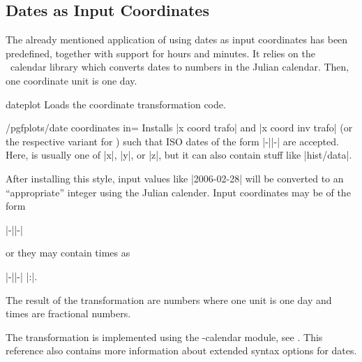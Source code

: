 \subsection{Dates as Input Coordinates}
{
\def\pgfplotsmanualcurlibrary{dateplot}
\label{pgfplots:sec:date:coords}
The already mentioned application of using dates as input coordinates has been predefined, together with support for hours and minutes. It relies on the \pgfname\ calendar library which converts dates to numbers in the Julian calendar. Then, one coordinate unit is one day.

\begin{pgfplotslibrary}{dateplot}
	Loads the coordinate transformation code.
\end{pgfplotslibrary}

\begin{stylekey}{/pgfplots/date coordinates in=}
	Installs |x coord trafo| and |x coord inv trafo| (or the respective variant for ) such that ISO dates of the form |-||-| are accepted. Here,  is usually one of |x|, |y|, or |z|, but it can also contain stuff like |hist/data|.
	
	After installing this style, input values like |2006-02-28| will be converted to an ``appropriate'' integer using the Julian calender. Input coordinates may be of the form
		
		|-||-|

	\noindent or they may contain times as

		|-||-| |:|.

	The result of the transformation are numbers where one unit is one day and times are fractional numbers.

	The transformation is implemented using the \pgfname-calendar module, see \cite[Calendar Library]{tikz}. This reference also contains more information about extended syntax options for dates.


\end{stylekey}}
